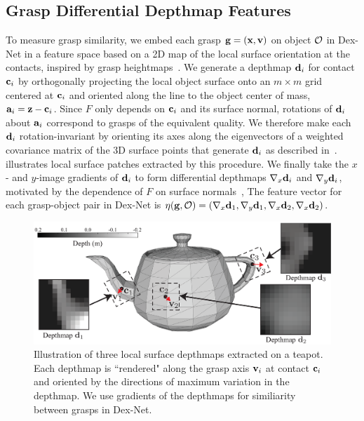 
\subsection{Grasp Differential Depthmap Features}
To measure grasp similarity, we embed each grasp $\mathbf{g} = (\mathbf{x} ,\mathbf{v})$ on object $\mathcal{O}$ in Dex-Net in a feature space based on a 2D map of the  local surface orientation at the contacts, inspired by grasp heightmaps~\cite{herzog2014learning, kappler2015leveraging}.
We generate a depthmap $\mathbf{d}_{i}$ for contact $\mathbf{c}_i$ by orthogonally projecting the local object surface onto an $m \times m$ grid centered at $\mathbf{c}_i$ and oriented along the line to the object center of mass, $\mathbf{a}_i = \mathbf{z} - \mathbf{c}_i$.
Since $F$ only depends on $\mathbf{c}_i$ and its surface normal, rotations of $\mathbf{d}_i$ about $\mathbf{a}_i$ correspond to grasps of the equivalent quality.
We therefore make each $\mathbf{d}_i$ rotation-invariant by orienting its axes along the eigenvectors of a weighted covariance matrix of the 3D surface points that generate $\mathbf{d}_i$ as described in~\cite{salti2014shot}.
 illustrates local surface patches extracted by this procedure.
We finally take the $x$- and $y$-image gradients of $\mathbf{d}_i$ to form differential depthmaps $\nabla_x \mathbf{d}_{i}$ and $\nabla_y \mathbf{d}_{i}$, motivated by the dependence of $F$ on surface normals~\cite{pokorny2013c}, 
The feature vector for each grasp-object pair  in Dex-Net is $\eta(\mathbf{g}, \mathcal{O}) = (\nabla_x \mathbf{d}_{1}, \nabla_y \mathbf{d}_{1}, \nabla_x \mathbf{d}_{2}, \nabla_x \mathbf{d}_{2})$.

\begin{figure}[t!]
\centering
\includegraphics[scale=0.30]{figures/illustrations/local_feature_model.eps}
\caption{Illustration of three local surface depthmaps extracted on a teapot. Each depthmap is ``rendered" along the grasp axis $\mathbf{v}_i$ at contact $\mathbf{c}_i$ and oriented by the directions of maximum variation in the depthmap.  We use gradients of the depthmaps for similiarity between grasps in Dex-Net.}
\vspace*{-15pt}
\end{figure}

